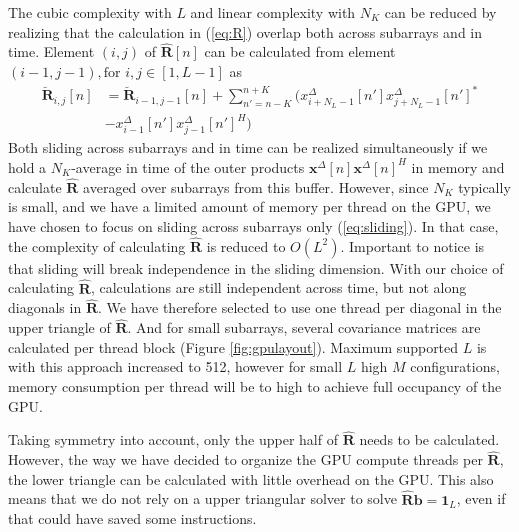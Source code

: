\documentclass[conference]{IEEEtran}
\newcommand{\mat}[1]{\mathbf{#1}}
\renewcommand{\vec}[1]{\mathbf{#1}}
\begin{document}
The cubic complexity with $L$ and linear complexity with $N_K$ can be reduced by realizing that the calculation in (\ref{eq:R}) overlap both across subarrays and in time. Element $(i,j)$ of $\mat{\hat{R}}[n]$ can be calculated from element $(i-1, j-1), \text{for } i,j \in [1, L-1]$ as
\begin{align}
\mat{\breve{R}}_{i,j}[n] &=  \mat{\breve{R}}_{i-1,j-1}[n]  + \sum_{n'=n-K}^{n+K} (x_{i+N_L-1}^{\Delta}[n']x_{j+N_L-1}^{\Delta}[n']^* \nonumber \\
 &- x_{i-1}^{\Delta}[n']x_{j-1}^{\Delta}[n']^H) \label{eq:sliding}
\end{align}
Both sliding across subarrays and in time can be realized simultaneously if we hold a $N_K$-average in time of the outer products $\vec{x}^{\Delta}[n]\vec{x}^{\Delta}[n]^H$ in memory and calculate $\mat{\hat{R}}$ averaged over subarrays from this buffer. However, since $N_K$ typically is small, and we have a limited amount of memory per thread on the GPU, we have chosen to focus on sliding across subarrays only (\ref{eq:sliding}). In that case, the complexity of calculating $\mat{\hat{R}}$ is reduced to $O(L^2)$. Important to notice is that sliding will break independence in the sliding dimension. With our choice of calculating $\mat{\hat{R}}$, calculations are still independent across time, but not along diagonals in $\mat{\hat{R}}$. We have therefore selected to use one thread per diagonal in the upper triangle of $\mat{\hat{R}}$. And for small subarrays, several covariance matrices are calculated per thread block (Figure \ref{fig:gpulayout}). Maximum supported $L$ is with this approach increased to 512, however for small $L$ high $M$ configurations, memory consumption per thread will be to high to achieve full occupancy of the GPU.

Taking symmetry into account, only the upper half of $\mat{\hat{R}}$ needs to be calculated. However, the way we have decided to organize the GPU compute threads per $\mat{\hat{R}}$, the lower triangle can be calculated with little overhead on the GPU. This also means that we do not rely on a upper triangular solver to solve $\mat{\hat{R}}\vec{b} = \vec{1}_L$, even if that could have saved some instructions.
\end{document}

